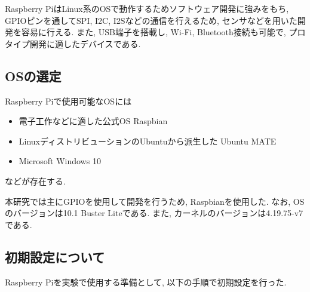 Raspberry PiはLinux系のOSで動作するためソフトウェア開発に強みをもち, GPIOピンを通してSPI, I2C, I2Sなどの通信を行えるため, センサなどを用いた開発を容易に行える. また, USB端子を搭載し, Wi-Fi, Bluetooth接続も可能で, プロタイプ開発に適したデバイスである. 

\subsection{OSの選定}\label{choose-os}

Raspberry Piで使用可能なOSには

\begin{itemize}
\tightlist
\item
  電子工作などに適した公式OS Raspbian
\item
  LinuxディストリビューションのUbuntuから派生した Ubuntu MATE
\item
  Microsoft Windows 10
\end{itemize}

などが存在する. 

本研究では主にGPIOを使用して開発を行うため, Raspbianを使用した. なお, OSのバージョンは10.1
Buster Liteである. また, カーネルのバージョンは4.19.75-v7である. 

\subsection{初期設定について}\label{about-setup}

Raspberry Piを実験で使用する準備として, 以下の手順で初期設定を行った. 

